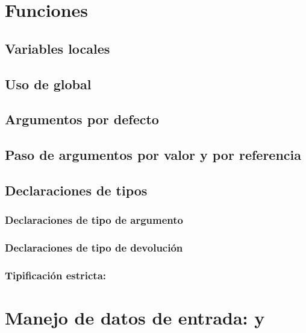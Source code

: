 \documentclass[a4paper,11pt,spanish]{sphinxmanual}
\begin{document}
\section{Funciones}
\label{\detokenize{contenidos:id109}}

\subsection{Variables locales}
\label{\detokenize{contenidos:id110}}

\subsection{Uso de global}
\label{\detokenize{contenidos:id111}}

\subsection{Argumentos por defecto}
\label{\detokenize{contenidos:id112}}

\subsection{Paso de argumentos por valor y por referencia}
\label{\detokenize{contenidos:id113}}

\subsection{Declaraciones de tipos}
\label{\detokenize{contenidos:id114}}

\subsubsection{Declaraciones de tipo de argumento}
\label{\detokenize{contenidos:id115}}

\subsubsection{Declaraciones de tipo de devolución}
\label{\detokenize{contenidos:id116}}

\subsubsection{Tipificación estricta: }
\label{\detokenize{contenidos:id117}}

\section{Manejo de datos de entrada:  y }
\label{\detokenize{contenidos:id118}}
\end{document}
